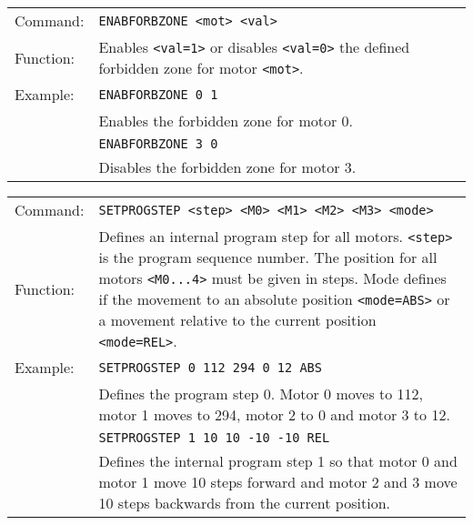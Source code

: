\vspace{\vdistace}

\begin{table}[h]
  \begin{tabularx}{\textwidth}{lX}
    Command:  & \texttt{ENABFORBZONE <mot> <val>}\\
    Function: & Enables \texttt{<val=1>} or disables \texttt{<val=0>} the
                defined forbidden zone for motor \texttt{<mot>}.\\
    Example:  & \texttt{ENABFORBZONE 0 1}\\
              & Enables the forbidden zone for motor 0.\\
              & \texttt{ENABFORBZONE 3 0}\\
              & Disables the forbidden zone for motor 3.
  \end{tabularx}
\end{table}

\vspace{\vdistace}

\begin{table}[h]
  \begin{tabularx}{\textwidth}{lX}
    Command:  & \texttt{SETPROGSTEP <step> <M0> <M1> <M2> <M3> <mode>}\\
    Function: & Defines an internal program step for all motors. \texttt{<step>}
                is the program sequence number. The position for all motors 
                \texttt{<M0...4>} must be given in steps. Mode defines if
                the movement to an absolute position \texttt{<mode=ABS>}
                or a movement relative to the current position \texttt{<mode=REL>}.\\
    Example:  & \texttt{SETPROGSTEP 0 112 294 0 12 ABS}\\
              & Defines the program step 0. Motor 0 moves to 112,
                motor 1 moves to 294, motor 2 to 0 and motor 3 to 12.\\
              & \texttt{SETPROGSTEP 1 10 10 -10 -10 REL}\\
              & Defines the internal program step 1 so that motor 0 and motor 1 move
                10 steps forward and motor 2 and 3 move 10 steps backwards from the
                current position.
  \end{tabularx}
\end{table}

\newpage

